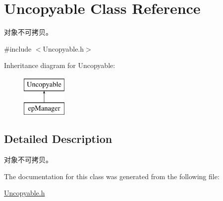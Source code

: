 \hypertarget{classUncopyable}{\section{\-Uncopyable \-Class \-Reference}
\label{classUncopyable}
}


对象不可拷贝。  




{\ttfamily \#include $<$\-Uncopyable.\-h$>$}

\-Inheritance diagram for \-Uncopyable\-:\begin{figure}[H]
\begin{center}
\leavevmode
\includegraphics[height=2.000000cm]{classUncopyable}
\end{center}
\end{figure}


\subsection{\-Detailed \-Description}
对象不可拷贝。 

\-The documentation for this class was generated from the following file\-:\begin{DoxyCompactItemize}
\item 
\hyperlink{Uncopyable_8h}{\-Uncopyable.\-h}\end{DoxyCompactItemize}
